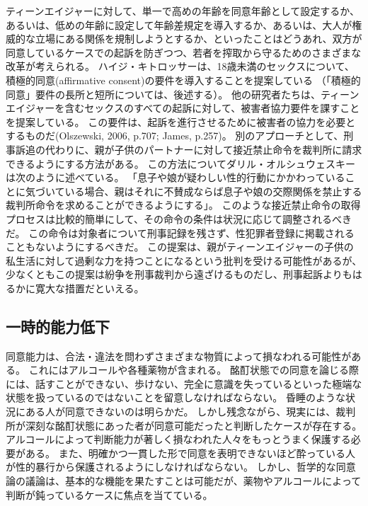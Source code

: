 \documentclass[paper=a4,book,openany]{jlreq}
\begin{document}
ティーンエイジャーに対して、単一で高めの年齢を同意年齢として設定するか、あるいは、低めの年齢に設定して年齢差規定を導入するか、あるいは、大人が権威的な立場にある関係を規制しようとするか、といったことはどうあれ、双方が同意しているケースでの起訴を防ぎつつ、若者を搾取から守るためのさまざまな改革が考えられる。
ハイジ・キトロッサーは、18歳未満のセックスについて、積極的同意(affirmative consent)の要件を導入することを提案している\citep{kitrosser97:_meanin_consen}
（「積極的同意」要件の長所と短所については、後述する）。
他の研究者たちは、ティーンエイジャーを含むセックスのすべての起訴に対して、被害者協力要件を課すことを提案している。
この要件は、起訴を進行させるために被害者の協力を必要とするものだ(Olszewski, 2006, p.707; James, p.257)。
\nocite{olszewski06:_commen_statut_rape_wiscon}\nocite{james09:_romeo_juliet_were_sex_offen}
別のアプローチとして、刑事訴追の代わりに、親が子供のパートナーに対して接近禁止命令を裁判所に請求できるようにする方法がある。
この方法についてダリル・オルシュウェスキーは次のように述べている。
「息子や娘が疑わしい性的行動にかかわっていることに気づいている場合、親はそれに不賛成ならば息子や娘の交際関係を禁止する裁判所命令を求めることができるようにする」\citep[p.718]{olszewski06:_commen_statut_rape_wiscon}。
このような接近禁止命令の取得プロセスは比較的簡単にして、その命令の条件は状況に応じて調整されるべきだ。
この命令は対象者について刑事記録を残さず、性犯罪者登録に掲載されることもないようにするべきだ。
この提案は、親がティーンエイジャーの子供の私生活に対して過剰な力を持つことになるという批判を受ける可能性があるが、少なくともこの提案は紛争を刑事裁判から遠ざけるものだし、刑事起訴よりもはるかに寛大な措置だといえる。

\subsection{一時的能力低下}

同意能力は、合法・違法を問わずさまざまな物質によって損なわれる可能性がある。
これにはアルコールや各種薬物が含まれる。
酩酊状態での同意を論じる際には、話すことができない、歩けない、完全に意識を失っているといった極端な状態を扱っているのではないことを留意しなければならない。
昏睡のような状況にある人が同意できないのは明らかだ。
しかし残念ながら、現実には、裁判所が深刻な酩酊状態にあった者が同意可能だったと判断したケースが存在する。
アルコールによって判断能力が著しく損なわれた人々をもっとうまく保護する必要がある。
また、明確かつ一貫した形で同意を表明できないほど酔っている人が性的暴行から保護されるようにしなければならない。
しかし、哲学的な同意論の議論は、基本的な機能を果たすことは可能だが、薬物やアルコールによって判断が鈍っているケースに焦点を当てている。
\end{document}
